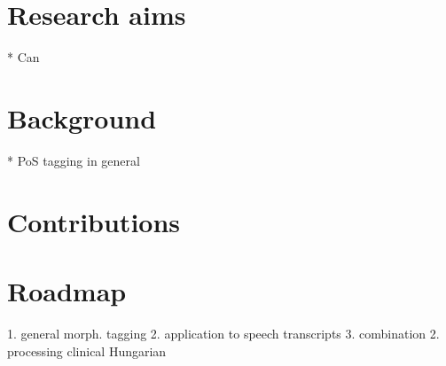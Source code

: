 
\section{Research aims}
* Can 
\section{Background}
* PoS tagging in general
\section{Contributions}
\section{Roadmap}
1. general morph. tagging
2. application to speech transcripts
3. combination
2. processing clinical Hungarian

